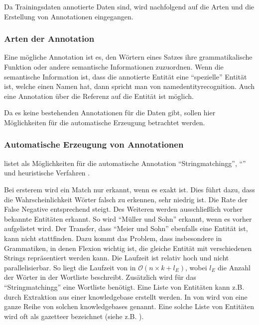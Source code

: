 Da Trainingsdaten annotierte Daten sind,
wird nachfolgend auf die Arten und die Erstellung von Annotationen eingegangen.

\subsubsection{Arten der Annotation}

Eine mögliche Annotation ist es, 
den Wörtern eines Satzes ihre grammatikalische Funktion
oder andere semantische Informationen
zuzuordnen.
Wenn die semantische Information ist,
dass die annotierte Entität eine \enquote{spezielle} Entität ist,
welche einen Namen hat,
dann spricht man von \gls{namedentityrecognition}.
Auch eine Annotation über die Referenz auf die Entität ist möglich.

Da es keine bestehenden Annotationen für die Daten gibt,
sollen hier Möglichkeiten für die automatische Erzeugung betrachtet werden.

\subsubsection{Automatische Erzeugung von Annotationen}

\citeauthor{2006.15509} listet als Möglichkeiten für die automatische Annotation
\enquote{Stringmatchingg}, \enquote{} und heuristische Verfahren
\autocite{2006.15509}.

Bei ersterem wird ein Match nur erkannt,
wenn es exakt ist.
Dies führt dazu,
dass die Wahrscheinlichkeit Wörter falsch zu erkennen,
sehr niedrig ist.
Die Rate der False Negative entsprechend steigt.
Des Weiteren werden ausschließlich vorher bekannte Entitäten erkannt.
So wird \enquote{Müller und Sohn} erkannt,
wenn es vorher aufgelistet wird.
Der Transfer,
dass \enquote{Meier und Sohn} ebenfalls eine Entität ist,
kann nicht stattfinden.
Dazu kommt das Problem,
dass insbesondere in Grammatiken,
in denen Flexion
wichtig ist,
die gleiche Entität mit verschiedenen Strings repräsentiert werden kann.
Die Laufzeit ist relativ hoch und nicht parallelisierbar.
So liegt die Laufzeit von 
in \(\mathcal{O}\left( n \times k + l_E \right)\),
wobei \(l_E\) die Anzahl der Wörter in der Wortliste beschreibt.
Zusätzlich wird für das \enquote{Stringmatchingg} eine Wortliste benötigt.
Eine Liste von Entitäten kann
z.B.\, durch Extraktion aus einer \gls{knowledgebase}
erstellt werden.
In \autocite[A.1]{2006.15509} von 
wird von \citeauthor{2006.15509} eine ganze Reihe von solchen \glspl{knowledgebase}
genannt.
Eine solche Liste von Entitäten wird oft als \gls{gazetteer} bezeichnet
(siehe z.B. \autocite[Introduction]{Carlson2009}).

